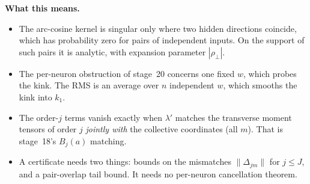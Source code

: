 \noindent\textbf{What this means.}
\begin{itemize}[leftmargin=1.2em,itemsep=1pt,topsep=1pt]
\item The arc-cosine kernel is singular only where two hidden directions coincide, which has probability
zero for pairs of independent inputs. On the support of such pairs it is analytic, with expansion parameter
$|\rho_\perp|$.
\item The per-neuron obstruction of stage~20 concerns one fixed $w$, which probes the kink. The RMS is an
average over $n$ independent $w$, which smooths the kink into $k_1$.
\item The order-$j$ terms vanish exactly when $\lambda'$ matches the transverse moment tensors of order $j$
\emph{jointly with} the collective coordinates (all $m$). That is stage~18's $B_j(a)$ matching.
\item A certificate needs two things: bounds on the mismatches $\|\Delta_{jm}\|$ for $j\le J$, and a pair-overlap tail
bound. It needs no per-neuron cancellation theorem.
\end{itemize}
